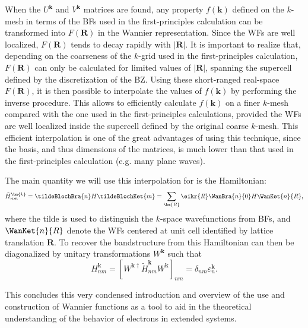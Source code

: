 When the $U^{\bm{k}}$ and $V^{\bm{k}}$ matrices are found, any property $f(\bm{k})$ defined on the $k$-mesh in terms of the BFs used in the first-principles calculation can be transformed into $F(\bm{R})$ in the Wannier representation.
Since the WFs are well localized, $F(\bm{R})$ tends to decay rapidly with $|\bm{R}|$.
It is important to realize that, depending on the coarseness of the $k$-grid used in the first-principles calculation, $F(\bm{R})$ can only be calculated for limited values of $|\bm{R}|$, spanning the supercell defined by the discretization of the BZ.
Using these short-ranged real-space $F(\bm{R})$, it is then possible to interpolate the values of $f(\bm{k})$ by performing the inverse procedure. This allows to efficiently calculate $f(\bm{k})$ on a finer $k$-mesh compared with the one used in the first-principles calculations, provided the WFs are well localized inside the supercell defined by the original coarse $k$-mesh.
This efficient interpolation is one of the great advantages of using this technique, since the basis, and thus dimensions of the matrices, is much lower than that used in the first-principles calculation (e.g. many plane waves).

The main quantity we will use this interpolation for is the Hamiltonian:
\begin{equation}
	\tilde{H}_{nm}^{\bm{k}} = \tildeBlochBra{n} H \tildeBlochKet{m} = \sum_{\bm{R}} \eikr{R} \WanBra{n}{0}H\WanKet{n}{R},
\end{equation}
where the tilde is used to distinguish the $k$-space wavefunctions from BFs, and $\WanKet{n}{R}$ denote the WFs centered at unit cell identified by lattice translation $\bm{R}$.
To recover the bandstructure from this Hamiltonian can then be diagonalized by unitary transformations $W^{\bm{k}}$ such that
\begin{equation}
H_{nm}^{\bm{k}} = [W^{\bm{k}\dagger} \tilde{H}_{nm}^{\bm{k}} W^{\bm{k}}]_{nm} = \delta_{nm} \varepsilon_{n}^{\bm{k}}.
\end{equation}

This concludes this very condensed introduction and overview of the use and construction of Wannier functions as a tool to aid in the theoretical understanding of the behavior of electrons in extended systems.

